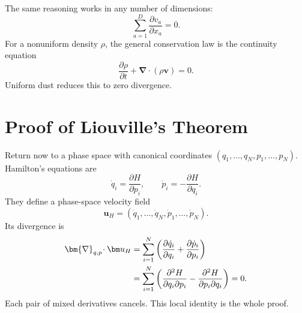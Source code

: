 \begin{classroomqa}
\end{classroomqa}

The same reasoning works in any number of dimensions:
\begin{equation}
 \sum_{a=1}^{D}\frac{\partial v_a}{\partial x_a}=0.
 \label{eq:l07-general-divergence}
\end{equation}
For a nonuniform density \(\rho\), the general conservation law is the
continuity equation
\begin{equation}
 \frac{\partial\rho}{\partial t}
 +\bm{\nabla}\!\cdot(\rho\bm v)=0.
 \label{eq:l07-continuity-equation}
\end{equation}
Uniform dust reduces this to zero divergence.

\begin{classroomqa}
\end{classroomqa}

\section{Proof of Liouville's Theorem}

Return now to a phase space with canonical coordinates
\((q_1,\ldots,q_N,p_1,\ldots,p_N)\). Hamilton's equations are
\begin{equation}
 \dot q_i=\frac{\partial H}{\partial p_i},
 \qquad
 \dot p_i=-\frac{\partial H}{\partial q_i}.
 \label{eq:l07-hamilton-equations}
\end{equation}
They define a phase-space velocity field
\begin{equation}
 \bm u_H=(\dot q_1,\ldots,\dot q_N,
          \dot p_1,\ldots,\dot p_N).
 \label{eq:l07-hamiltonian-flow-field}
\end{equation}
Its divergence is
\begin{align}
 \bm{\nabla}_{q,p}\!\cdot\bm u_H
 &=\sum_{i=1}^{N}
 \left(
  \frac{\partial\dot q_i}{\partial q_i}
  +\frac{\partial\dot p_i}{\partial p_i}
 \right) \notag\\
 &=\sum_{i=1}^{N}
 \left(
  \frac{\partial^2 H}{\partial q_i\partial p_i}
  -\frac{\partial^2 H}{\partial p_i\partial q_i}
 \right)=0.
 \label{eq:l07-liouville-cancellation}
\end{align}
Each pair of mixed derivatives cancels. This local identity is the whole
proof.

